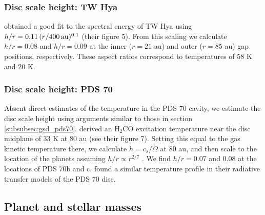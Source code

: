 \documentclass[fleqn,usenatbib]{mnras}
\begin{document}
\subsubsection{Disc scale height: TW Hya}
\label{subsubsec:hr_tw}
\cite{calahan_etal_2020} obtained a good fit to the spectral energy of TW Hya using $h/r = 0.11 \,(r/400\,\rm au)^{0.1}$ (their figure 5). From this scaling we calculate $h/r = 0.08$ and $h/r = 0.09$ at the inner ($r= 21$ au) and outer ($r= 85$ au) gap positions, respectively. These aspect ratios correspond to temperatures of 58 K and 20 K.

\subsubsection{Disc scale height: PDS 70}
Absent direct estimates of the temperature in the PDS 70 cavity, we estimate the disc scale height using arguments similar to those in section \ref{subsubsec:gsd_pds70}. \cite{facchini_etal_2021} derived an H$_2$CO excitation temperature near the disc midplane of 33 K at 80 au (see their figure 7). Setting this equal to the gas kinetic temperature there, we calculate $h = c_s/\Omega$ at 80 au, and then scale to the location of the planets assuming $h/r \propto r^{2/7}$ \citep{chiang_goldreich_1997}. We find $h/r = 0.07$ and 0.08 at the locations of PDS 70b and c. \citet{keppler_etal_2018} found a similar temperature profile in their radiative transfer models of the PDS 70 disc.

\subsection{Planet and stellar masses}
\end{document}
